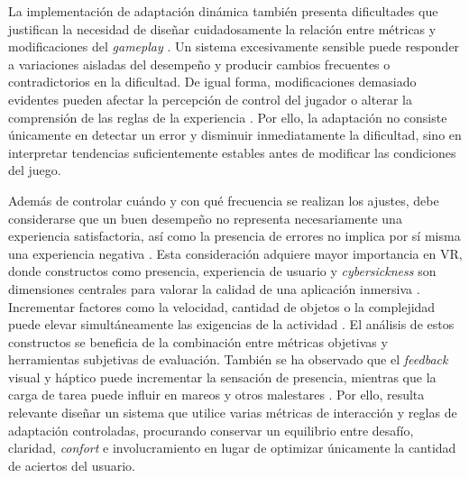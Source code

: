 La implementación de adaptación dinámica también presenta dificultades 
que justifican la necesidad de diseñar cuidadosamente la relación entre 
métricas y modificaciones del \textit{gameplay} 
\cite{xue2017dda,zohaib2018dda}. Un sistema excesivamente sensible puede 
responder a variaciones aisladas del desempeño y producir cambios 
frecuentes o contradictorios en la dificultad. De igual forma, 
modificaciones demasiado evidentes pueden afectar la percepción de 
control del jugador o alterar la comprensión de las reglas de la 
experiencia \cite{lopes2025closing,zook2012temporal}. Por ello, la
adaptación no consiste únicamente en detectar un error y disminuir 
inmediatamente la dificultad, sino en interpretar tendencias 
suficientemente estables antes de modificar las condiciones del juego.

Además de controlar cuándo y con qué frecuencia se realizan los ajustes, 
debe considerarse que un buen desempeño no representa necesariamente una 
experiencia satisfactoria, así como la presencia de errores no implica 
por sí misma una experiencia negativa \cite{yannakakis2009adaptation,rashed2025engagement}.
Esta consideración adquiere mayor importancia en VR, donde constructos 
como presencia, experiencia de usuario y \textit{cybersickness} son 
dimensiones centrales para valorar la calidad de una aplicación 
inmersiva \cite{wang2025presence,bareisyte2024questionnaires}. 
Incrementar factores como la velocidad, cantidad de objetos o la 
complejidad puede elevar simultáneamente las exigencias de la 
actividad \cite{sepich2022workload}. El análisis de estos constructos se 
beneficia de la combinación entre métricas objetivas y herramientas 
subjetivas de evaluación. También se ha observado que el 
\textit{feedback} visual y háptico puede incrementar la sensación de 
presencia, mientras que la carga de tarea puede influir en mareos y otros 
malestares \cite{sepich2022workload,gibbs2022feedback}. Por ello, resulta 
relevante diseñar un sistema que utilice varias métricas de interacción 
y reglas de adaptación controladas, procurando conservar un equilibrio 
entre desafío, claridad, \textit{confort} e involucramiento en lugar de 
optimizar únicamente la cantidad de aciertos del usuario.

